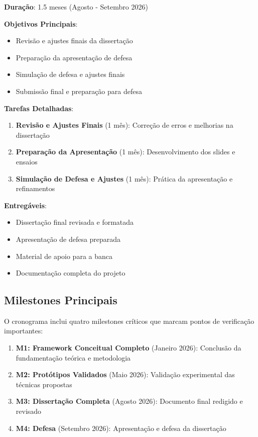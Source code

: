 \textbf{Duração}: 1.5 meses (Agosto - Setembro 2026)

\textbf{Objetivos Principais}:
\begin{itemize}
\item Revisão e ajustes finais da dissertação
\item Preparação da apresentação de defesa
\item Simulação de defesa e ajustes finais
\item Submissão final e preparação para defesa
\end{itemize}

\textbf{Tarefas Detalhadas}:
\begin{enumerate}
\item \textbf{Revisão e Ajustes Finais} (1 mês): Correção de erros e melhorias na dissertação
\item \textbf{Preparação da Apresentação} (1 mês): Desenvolvimento dos slides e ensaios
\item \textbf{Simulação de Defesa e Ajustes} (1 mês): Prática da apresentação e refinamentos
\end{enumerate}

\textbf{Entregáveis}:
\begin{itemize}
\item Dissertação final revisada e formatada
\item Apresentação de defesa preparada
\item Material de apoio para a banca
\item Documentação completa do projeto
\end{itemize}

\subsection{Milestones Principais}

O cronograma inclui quatro milestones críticos que marcam pontos de verificação importantes:

\begin{enumerate}
\item \textbf{M1: Framework Conceitual Completo} (Janeiro 2026): Conclusão da fundamentação teórica e metodologia
\item \textbf{M2: Protótipos Validados} (Maio 2026): Validação experimental das técnicas propostas
\item \textbf{M3: Dissertação Completa} (Agosto 2026): Documento final redigido e revisado
\item \textbf{M4: Defesa} (Setembro 2026): Apresentação e defesa da dissertação
\end{enumerate}

